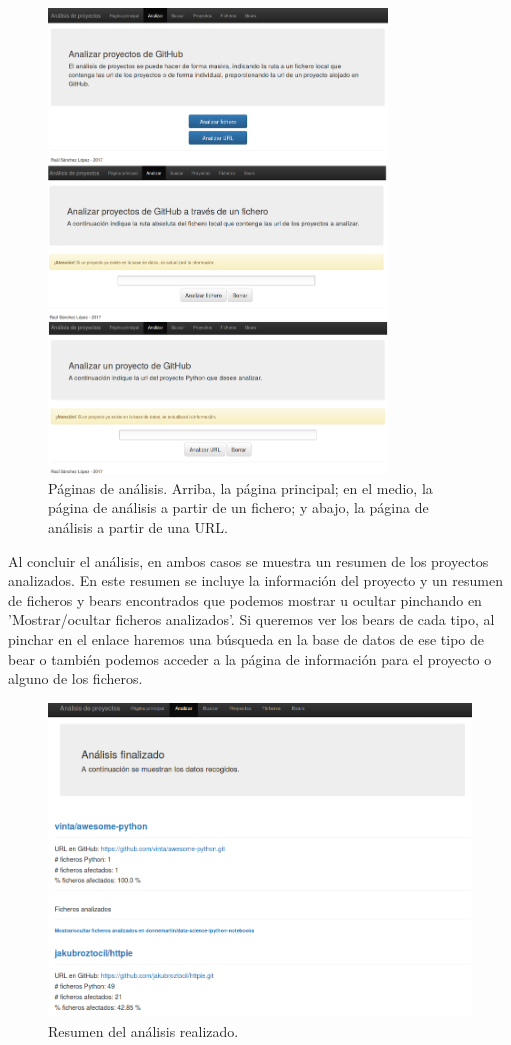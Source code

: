 \documentclass[a4paper, 12pt]{book}
\begin{document}
\begin{figure}[h]
  \centering
  \includegraphics[width=9cm, keepaspectratio]{img/webAnalisis}
  \caption{Páginas de análisis. Arriba, la página principal; en el medio, la página de análisis a partir de un fichero; y abajo, la página de análisis a partir de una URL.}
  \label{fig:webAnalisis}
\end{figure}

Al concluir el análisis, en ambos casos se muestra un resumen de los proyectos analizados. En este resumen se incluye la información del proyecto y un resumen de ficheros y bears encontrados que podemos mostrar u ocultar pinchando en 'Mostrar/ocultar ficheros analizados'. Si queremos ver los bears de cada tipo, al pinchar en el enlace haremos una búsqueda en la base de datos de ese tipo de bear o también podemos acceder a la página de información para el proyecto o alguno de los ficheros.

\begin{figure}[h]
  \centering
  \includegraphics[width=12cm, keepaspectratio]{img/resumenAnalisis}
  \caption{Resumen del análisis realizado.}
  \label{fig:resumenAnalisis}
\end{figure}
\end{document}
